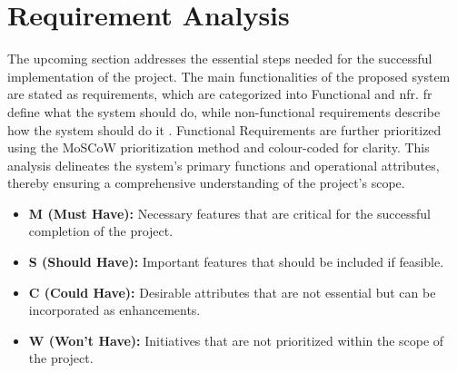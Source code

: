 \section{Requirement Analysis }
\label{sec:req}

The upcoming section addresses the essential steps needed for the successful implementation of the project. The main functionalities of the proposed system are stated as requirements, which are categorized into Functional and \gls{nfr}. \gls{fr} define what the system should do, while non-functional requirements describe how the system should do it \citep{geeksforgeeks2024functional}. Functional Requirements are further prioritized using the MoSCoW prioritization method and colour-coded for clarity. This analysis delineates the system's primary functions and operational attributes, thereby ensuring a comprehensive understanding of the project's scope. \\

\begin{itemize}
    \item \textbf{M (Must Have):} Necessary features that are critical for the successful completion of the project.
    \item \textbf{S (Should Have):} Important features that should be included if feasible.
    \item \textbf{C (Could Have):} Desirable attributes that are not essential but can be incorporated as enhancements.
    \item \textbf{W (Won’t Have): }Initiatives that are not prioritized within the scope of the project. \\
\end{itemize} 


